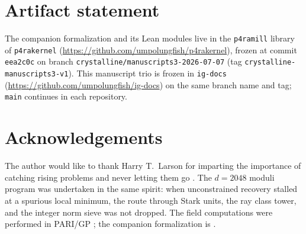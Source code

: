 \documentclass[12pt,a4paper]{article}
\begin{document}
\section*{Artifact statement}
The companion formalization \cite{StarkHilbert12} and its Lean modules live in
the \texttt{p4ramill} library of \texttt{p4rakernel}
(\url{https://github.com/umpolungfish/p4rakernel}), frozen at commit
\texttt{eea2c0c} on branch \texttt{crystalline/manuscripts3-2026-07-07} (tag
\texttt{crystalline-manuscripts3-v1}). This manuscript trio is frozen in
\texttt{ig-docs} (\url{https://github.com/umpolungfish/ig-docs}) on the same
branch name and tag; \texttt{main} continues in each repository.

\section*{Acknowledgements}
The author would like to thank Harry T.\ Larson for imparting the importance
of catching rising problems and never letting them go \cite{Larson1961}.
The $d=2048$ moduli program was undertaken in the same spirit: when
unconstrained recovery stalled at a spurious local minimum, the route through
Stark units, the ray class tower, and the integer norm sieve was not dropped.
The field computations were performed in PARI/GP \cite{PARI}; the companion
formalization is \cite{StarkHilbert12}.
\end{document}
